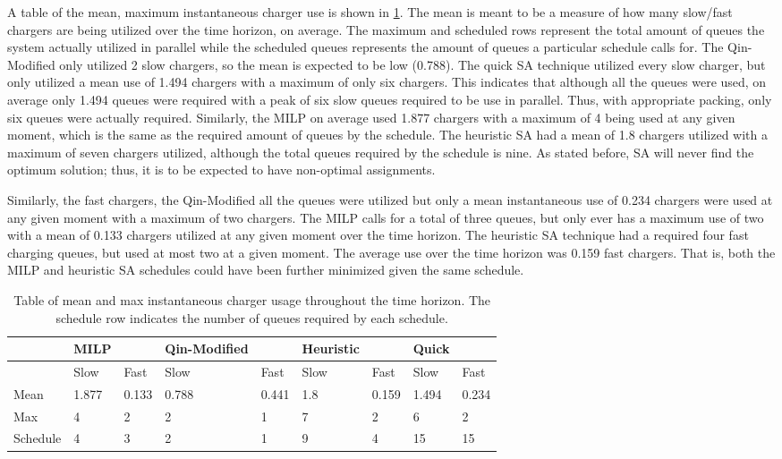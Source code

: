 \documentclass[energies,article,submit,moreauthors]{Definitions/mdpi}
\begin{document}
A table of the mean, maximum instantaneous charger use is shown in \ref{tab:charge-count}. The mean is meant to be a
measure of how many slow/fast chargers are being utilized over the time horizon, on average. The maximum and scheduled
rows represent the total amount of queues the system actually utilized in parallel while the scheduled queues represents
the amount of queues a particular schedule calls for. The Qin-Modified only utilized 2 slow chargers, so the mean is
expected to be low (0.788). The quick SA technique utilized every slow charger, but only utilized a mean use of 1.494
chargers with a maximum of only six chargers. This indicates that although all the queues were used, on average only
1.494 queues were required with a peak of six slow queues required to be use in parallel. Thus, with appropriate
packing, only six queues were actually required. Similarly, the MILP on average used 1.877 chargers with a maximum of 4
being used at any given moment, which is the same as the required amount of queues by the schedule. The heuristic SA had
a mean of 1.8 chargers utilized with a maximum of seven chargers utilized, although the total queues required by the
schedule is nine. As stated before, SA will never find the optimum solution; thus, it is to be expected to have
non-optimal assignments.

Similarly, the fast chargers, the Qin-Modified all the queues were utilized but only a mean instantaneous use of 0.234
chargers were used at any given moment with a maximum of two chargers. The MILP calls for a total of three queues, but
only ever has a maximum use of two with a mean of 0.133 chargers utilized at any given moment over the time horizon. The
heuristic SA technique had a required four fast charging queues, but used at most two at a given moment. The average use
over the time horizon was 0.159 fast chargers. That is, both the MILP and heuristic SA schedules could have been further
minimized given the same schedule.

\begin{table}[htbp]
\caption{\label{tab:charge-count}Table of mean and max instantaneous charger usage throughout the time horizon. The schedule row indicates the number of queues required by each schedule.}
\centering
\begin{tabular}{|l|ll|ll|ll|ll|}
\hline
 & MILP &  & Qin-Modified &  & Heuristic &  & Quick & \\[0pt]
\hline
 & Slow & Fast & Slow & Fast & Slow & Fast & Slow & Fast\\[0pt]
Mean & 1.877 & 0.133 & 0.788 & 0.441 & 1.8 & 0.159 & 1.494 & 0.234\\[0pt]
Max & 4 & 2 & 2 & 1 & 7 & 2 & 6 & 2\\[0pt]
Schedule & 4 & 3 & 2 & 1 & 9 & 4 & 15 & 15\\[0pt]
\hline
\end{tabular}
\end{table}
\end{document}
